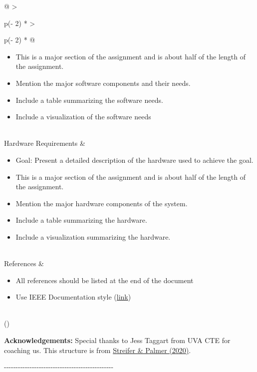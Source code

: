 \documentclass[
  letterpaper,
  DIV=11,
  numbers=noendperiod]{scrreprt}
\begin{document}
\begin{longtable}[]{@{}
  >{\raggedright\arraybackslash}p{(\columnwidth - 2\tabcolsep) * }
  >{\raggedright\arraybackslash}p{(\columnwidth - 2\tabcolsep) * }@{}}
\begin{minipage}[t]{\linewidth}
\begin{itemize}
  Goal: Present a detailed description of the software used to achieve
  the goal.
\item
  This is a major section of the assignment and is about half of the
  length of the assignment.
\item
  Mention the major software components and their needs.
\item
  Include a table summarizing the software needs.
\item
  Include a visualization of the software needs
\end{itemize}
\end{minipage} \\
Hardware Requirements & \begin{minipage}[t]{\linewidth}\raggedright
\begin{itemize}
\item
  Goal: Present a detailed description of the hardware used to achieve
  the goal.
\item
  This is a major section of the assignment and is about half of the
  length of the assignment.
\item
  Mention the major hardware components of the system.
\item
  Include a table summarizing the hardware.
\item
  Include a visualization summarizing the hardware.
\end{itemize}
\end{minipage} \\
References & \begin{minipage}[t]{\linewidth}\raggedright
\begin{itemize}
\item
  All references should be listed at the end of the document
\item
  Use IEEE Documentation style
  (\href{https://ieee-dataport.org/sites/default/\%20files/analysis/27/IEEE\%20Citation\%20Guidelines.pdf}{link})
\end{itemize}
\end{minipage} \\
\bottomrule()
\end{longtable}

\textbf{Acknowledgements:} Special thanks to Jess Taggart from UVA CTE
for coaching us. This structure is from
\href{https://cte.virginia.edu/blog/2020/12/04/alternative-grading-practices-support-both-equity-and-learning}{Streifer
\& Palmer (2020)}.

-\/-\/-\/-\/-\/-\/-\/-\/-\/-\/-\/-\/-\/-\/-\/-\/-\/-\/-\/-\/-\/-\/-\/-\/-\/-\/-\/-\/-\/-\/-\/-\/-\/-\/-\/-\/-\/-\/-\/-\/-\/-\/-\/-\/-\/-\/-
\end{document}
